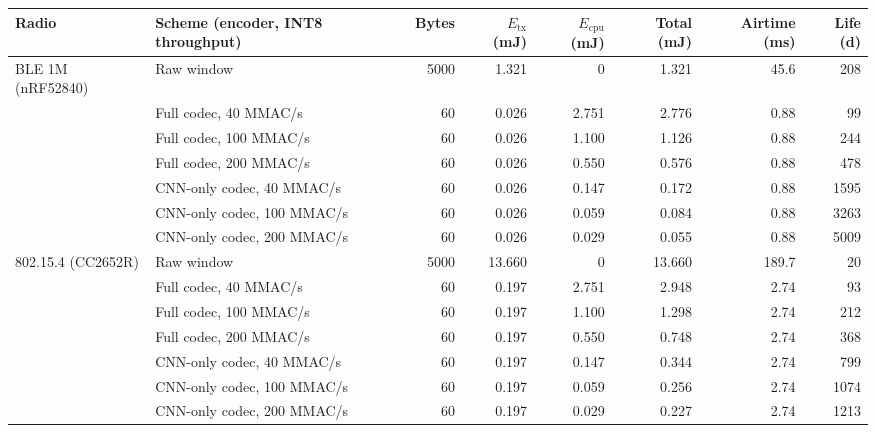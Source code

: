 \begin{tabular}{llrrrrrr}
\toprule
Radio & Scheme (encoder, INT8 throughput) & Bytes & $E_\mathrm{tx}$ (mJ) & $E_\mathrm{cpu}$ (mJ) & Total (mJ) & Airtime (ms) & Life (d) \\
\midrule
BLE 1M (nRF52840) & Raw window & 5000 & 1.321 & 0 & 1.321 & 45.6 & 208 \\
 & Full codec, 40 MMAC/s & 60 & 0.026 & 2.751 & 2.776 & 0.88 & 99 \\
 & Full codec, 100 MMAC/s & 60 & 0.026 & 1.100 & 1.126 & 0.88 & 244 \\
 & Full codec, 200 MMAC/s & 60 & 0.026 & 0.550 & 0.576 & 0.88 & 478 \\
 & CNN-only codec, 40 MMAC/s & 60 & 0.026 & 0.147 & 0.172 & 0.88 & 1595 \\
 & CNN-only codec, 100 MMAC/s & 60 & 0.026 & 0.059 & 0.084 & 0.88 & 3263 \\
 & CNN-only codec, 200 MMAC/s & 60 & 0.026 & 0.029 & 0.055 & 0.88 & 5009 \\
\midrule
802.15.4 (CC2652R) & Raw window & 5000 & 13.660 & 0 & 13.660 & 189.7 & 20 \\
 & Full codec, 40 MMAC/s & 60 & 0.197 & 2.751 & 2.948 & 2.74 & 93 \\
 & Full codec, 100 MMAC/s & 60 & 0.197 & 1.100 & 1.298 & 2.74 & 212 \\
 & Full codec, 200 MMAC/s & 60 & 0.197 & 0.550 & 0.748 & 2.74 & 368 \\
 & CNN-only codec, 40 MMAC/s & 60 & 0.197 & 0.147 & 0.344 & 2.74 & 799 \\
 & CNN-only codec, 100 MMAC/s & 60 & 0.197 & 0.059 & 0.256 & 2.74 & 1074 \\
 & CNN-only codec, 200 MMAC/s & 60 & 0.197 & 0.029 & 0.227 & 2.74 & 1213 \\
\bottomrule
\end{tabular}
